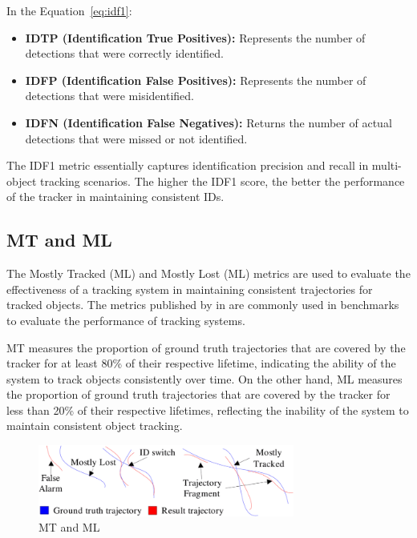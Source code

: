 In the Equation~\ref{eq:idf1}:

\begin{itemize}
    \item \textbf{IDTP (Identification True Positives):} Represents the number of detections that were correctly identified.
    \item \textbf{IDFP (Identification False Positives):} Represents the number of detections that were misidentified.
    \item \textbf{IDFN (Identification False Negatives):} Returns the number of actual detections that were missed or not identified.
\end{itemize}

The IDF1 metric essentially captures identification precision and recall in multi-object tracking scenarios. The higher the IDF1 score, the better the performance of the tracker in maintaining consistent IDs.

\subsection{MT and ML}\label{subsec:mt_ml}
The Mostly Tracked (ML) and Mostly Lost (ML) metrics are used to evaluate the effectiveness of a tracking system in maintaining consistent trajectories for tracked objects. The metrics published by \textcite{Wu06} in \citeyear{Wu06} are commonly used in benchmarks to evaluate the performance of tracking systems.

MT measures the proportion of ground truth trajectories that are covered by the tracker for at least 80\% of their respective lifetime, indicating the ability of the system to track objects consistently over time. On the other hand, ML measures the proportion of ground truth trajectories that are covered by the tracker for less than 20\% of their respective lifetimes, reflecting the inability of the system to maintain consistent object tracking.

\begin{figure}[ht]
    \centering
    \includegraphics[width=0.75\textwidth]{resources/fig/Wu06-MT_ML.png}
    \caption[MT and ML]{MT and ML~\cite[source image:][Fig.~5]{Wu06}}\label{fig:mt_ml}
\end{figure}

